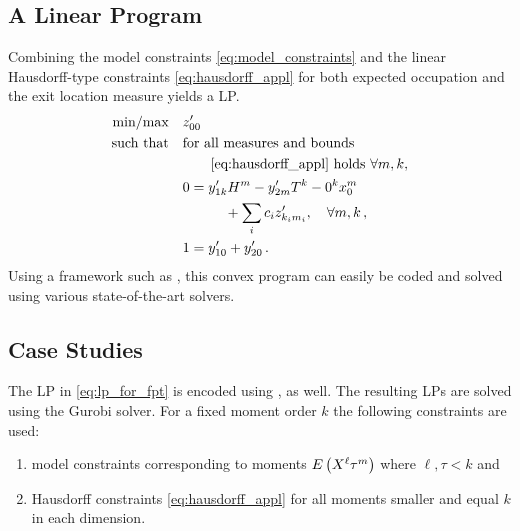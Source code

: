 \subsection{A Linear Program}
Combining the model constraints \eqref{eq:model_constraints} and the
linear Hausdorff-type constraints \eqref{eq:hausdorff_appl} for both
expected occupation and the exit location measure yields a \ac{LP}.
\begin{equation}\label{eq:lp_for_fpt}
  \begin{split}
    \text{min} / \text{max} \hspace{1em}&  z_{00}^{\prime} \\
    \text{such that}\hspace{1em} & \text{for all measures and bounds}\\
    &\qquad\eqref{eq:hausdorff_appl}\text{ holds }\forall m, k,\\
    & 0= y_{1k}' H^m -  y_{2m}'T^k - 0^k x_0^m \\
    &\qquad\quad+\sum_i c_i  z_{k_i m_i}', \quad\forall m, k\,,\\
    & 1 = y_{10}' + y_{20}'\,.
  \end{split}
\end{equation}
Using a framework such as , this convex program can
easily be coded and solved using various state-of-the-art solvers.

\subsection{Case Studies}
The \ac{LP} in \eqref{eq:lp_for_fpt} is encoded using , as well.
The resulting \acp{LP} are solved using the Gurobi \parencite{gurobi} solver.
For a fixed moment order $k$ the following constraints are used:
\begin{enumerate}
  \item model constraints corresponding to moments
    ${E}\left(X^{\ell}{\tau}^{m}\right)$ where $\ell,\tau< k$ and
  \item Hausdorff constraints \eqref{eq:hausdorff_appl} for all
    moments smaller and equal $k$ in each dimension.
\end{enumerate}

